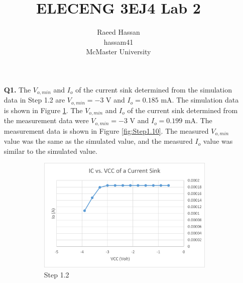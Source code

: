 \documentclass[12pt]{article}
\title{ELECENG 3EJ4 Lab 2}
\author{Raeed Hassan \\ hassam41 \\ McMaster University}
\begin{document}
\maketitle
\pagebreak
\begin{itemize}
    \section*{Part 1}
    \item [\textbf{Q1.}]
    The $V_{o,min}$ and $I_o$ of the current sink determined from the simulation data in Step 1.2 are $V_{o,min} = -3$ V and $I_o = 0.185$ mA. The simulation data is shown in Figure \ref{fig:Step1.2}. The $V_{o,min}$ and $I_o$ of the current sink determined from the measurement data were $V_{o,min} = -3$ V and $I_o = 0.199$ mA. The measurement data is shown in Figure \ref{fig:Step1.10}. The measured $V_{o,min}$ value was the same as the simulated value, and the measured $I_o$ value was similar to the simulated value.
    \begin{figure}[!ht]
        \centering
        \begin{subfigure}[b]{0.45\textwidth}
            \centering
            \includegraphics[width=\textwidth]{Step1.2}
            \caption{Step 1.2}
            \label{fig:Step1.2}
        \end{subfigure}
        \begin{subfigure}[b]{0.46\textwidth}
            \centering

\end{subfigure}
\end{figure}
\end{itemize}
\end{document}
